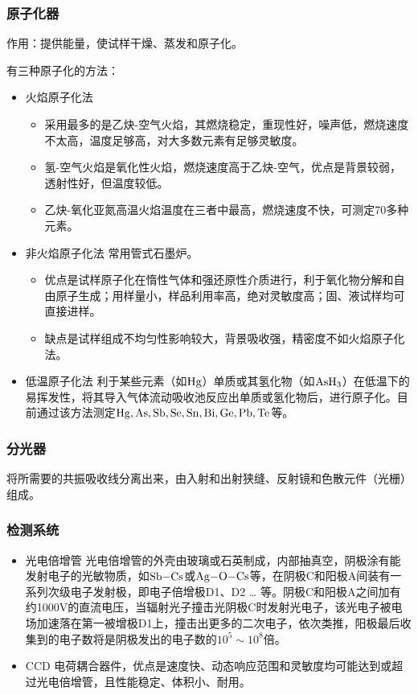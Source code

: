 \subsubsection{原子化器}
作用：提供能量，使试样干燥、蒸发和原子化。

有三种原子化的方法：

\begin{itemize}
	\item 火焰原子化法
	\begin{itemize}
		\item 采用最多的是乙炔-空气火焰，其燃烧稳定，重现性好，噪声低，燃烧速度不太高，温度足够高，对大多数元素有足够灵敏度。
		\item 氢-空气火焰是氧化性火焰，燃烧速度高于乙炔-空气，优点是背景较弱，透射性好，但温度较低。
		\item 乙炔-氧化亚氮高温火焰温度在三者中最高，燃烧速度不快，可测定70多种元素。
	\end{itemize}
	\item 非火焰原子化法
	常用管式石墨炉。
	\begin{itemize}
		\item 优点是试样原子化在惰性气体和强还原性介质进行，利于氧化物分解和自由原子生成；用样量小，样品利用率高，绝对灵敏度高；固、液试样均可直接进样。
		\item 缺点是试样组成不均匀性影响较大，背景吸收强，精密度不如火焰原子化法。
	\end{itemize}
	\item 低温原子化法
		利于某些元素（如$\ce{Hg}$）单质或其氢化物（如$\ce{AsH3}$）在低温下的易挥发性，将其导入气体流动吸收池反应出单质或氢化物后，进行原子化。目前通过该方法测定$\ce{Hg, As, Sb, Se, Sn, Bi, Ge, Pb, Te}$等。
\end{itemize}

\subsubsection{分光器}
将所需要的共振吸收线分离出来，由入射和出射狭缝、反射镜和色散元件（光栅）组成。

\subsubsection{检测系统}
\begin{itemize}
	\item 光电倍增管
光电倍增管的外壳由玻璃或石英制成，内部抽真空，阴极涂有能发射电子的光敏物质，如$\ce{Sb-Cs}$或$\ce{Ag-O-Cs}$等，在阴极C和阳极A间装有一系列次级电子发射极，即电子倍增极D1、D2 … 等。阴极C和阳极A之间加有约1000V的直流电压，当辐射光子撞击光阴极C时发射光电子，该光电子被电场加速落在第一被增极D1上，撞击出更多的二次电子，依次类推，阳极最后收集到的电子数将是阴极发出的电子数的$10^5\sim 10^8$倍。
	\item CCD
电荷耦合器件，优点是速度快、动态响应范围和灵敏度均可能达到或超过光电倍增管，且性能稳定、体积小、耐用。
\end{itemize}

